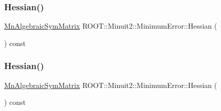 \mbox{\label{classROOT_1_1Minuit2_1_1MinimumError_a7f591009a8e0d017a77da5efa5f6a7e0}} 
\subsubsection{\texorpdfstring{Hessian()}{Hessian()}\hspace{0.1cm}{\footnotesize\ttfamily [1/3]}}
{\footnotesize\ttfamily \mbox{\hyperlink{namespaceROOT_1_1Minuit2_a9e74ad97f5537a2e80e52b04d98ecc6e}{Mn\+Algebraic\+Sym\+Matrix}} R\+O\+O\+T\+::\+Minuit2\+::\+Minimum\+Error\+::\+Hessian (\begin{DoxyParamCaption}{ }\end{DoxyParamCaption}) const\hspace{0.3cm}{\ttfamily [inline]}}

\mbox{\label{classROOT_1_1Minuit2_1_1MinimumError_a7f591009a8e0d017a77da5efa5f6a7e0}} 
\subsubsection{\texorpdfstring{Hessian()}{Hessian()}\hspace{0.1cm}{\footnotesize\ttfamily [2/3]}}
{\footnotesize\ttfamily \mbox{\hyperlink{namespaceROOT_1_1Minuit2_a9e74ad97f5537a2e80e52b04d98ecc6e}{Mn\+Algebraic\+Sym\+Matrix}} R\+O\+O\+T\+::\+Minuit2\+::\+Minimum\+Error\+::\+Hessian (\begin{DoxyParamCaption}{ }\end{DoxyParamCaption}) const\hspace{0.3cm}{\ttfamily [inline]}}

